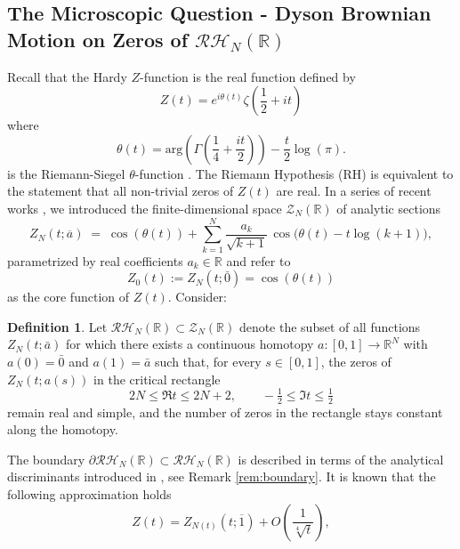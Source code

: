\documentclass[12pt,reqno]{amsart}
\theoremstyle{plain}
\theoremstyle{definition}
\newtheorem*{dfnnonum}{Definition}
\theoremstyle{remark}
\begin{document}
\subsection{The Microscopic Question - Dyson Brownian Motion on Zeros of $\mathcal{RH}_N(\mathbb{R})$} Recall that the Hardy $Z$-function is the real function defined by
\begin{equation} \label{eq:Hardy}
Z(t) = e^{i \theta(t)} \zeta \left ( \frac{1}{2} +it \right )
\end{equation}
where
\begin{equation} \label{eq:RS-theta}
\theta(t) = \text{arg} \left ( \Gamma \left ( \frac{1}{4} + \frac{i t}{2} \right ) \right ) -\frac{t}{2} \log(\pi).
 \end{equation} 
 is the Riemann-Siegel \(\theta\)-function \cite{E,I}. The Riemann Hypothesis (RH) is equivalent to the statement that all non-trivial zeros of $Z(t)$ are real. 
In a series of recent works \cite{J,J4,J5,J3}, we introduced the finite-dimensional space \(\mathcal{Z}_N( \mathbb{R}) \) of analytic sections
\begin{equation}
Z_{N}(t; \overline{a})
\;=\;
\cos(\theta(t))
+\sum_{k=1}^{N}\frac{a_{k}}{\sqrt{k+1}}\,
\cos\bigl(\theta(t)-t\log(k+1)\bigr),
\end{equation}
parametrized by real coefficients \(a_k \in \mathbb{R}\) and refer to 
\begin{equation}
Z_0(t):=Z_N(t; \bar{0})=\cos (\theta(t))
\end{equation} as the core function of $Z(t)$. Consider:
\begin{dfnnonum}
Let \(\mathcal{RH}_N(\mathbb{R}) \subset \mathcal{Z}_N(\mathbb{R})\) denote the subset of all functions \(Z_N(t;\bar a)\)
for which there exists a continuous homotopy \(a:[0,1]\to\mathbb{R}^N\) with \(a(0)=\bar 0\) and \(a(1)=\bar a\) such that,
for every \(s\in[0,1]\), the zeros of \(Z_N(t;a(s))\) in the critical rectangle
\begin{equation}
2N \le \Re t \le 2N+2,\qquad -\tfrac12 \le \Im t \le \tfrac12
\end{equation}
remain real and simple, and the number of zeros in the rectangle stays constant along the homotopy.
\end{dfnnonum}
The boundary $\partial \mathcal{RH}_N(\mathbb{R}) \subset \mathcal{RH}_N(\mathbb{R})$ is described in terms of the analytical discriminants introduced in \cite{J3}, see Remark \ref{rem:boundary}. It is known that the following approximation holds
\begin{equation} 
\label{eq:approx}
Z(t) = Z_{N(t)}(t ; \overline{1})+ O \left ( \frac{1}{\sqrt[4]{t}} \right ),
\end{equation}
\end{document}
